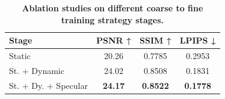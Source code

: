 \begin{table}[t]
\centering
\small
\caption{\textbf{Ablation studies on different coarse to fine training strategy stages.}}
\label{tab:stage}
\vspace{-2mm}
\begin{tabular}{lccc}
\toprule
Stage & PSNR ↑ & SSIM ↑ & LPIPS ↓ \\
\midrule
Static &20.26  & 0.7785 & 0.2953 \\
St. + Dynamic &24.02  &0.8508  &0.1831  \\
St. + Dy. + Specular &\textbf{24.17}  &\textbf{0.8522}  &\textbf{0.1778}  \\
\bottomrule
\end{tabular}
\end{table}
